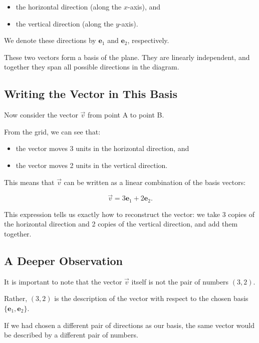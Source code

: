 \documentclass[11pt,openany]{book}
\theoremstyle{definition}
\begin{document}
\begin{itemize}
  \item the horizontal direction (along the $x$-axis), and
  \item the vertical direction (along the $y$-axis).
\end{itemize}

We denote these directions by $\mathbf{e}_1$ and $\mathbf{e}_2$, respectively.

These two vectors form a basis of the plane. 
They are linearly independent, and together they span all possible directions in the diagram.

\medskip

\subsection{Writing the Vector in This Basis}

Now consider the vector $\vec{v}$ from point A to point B.

From the grid, we can see that:

\begin{itemize}
  \item the vector moves 3 units in the horizontal direction, and
  \item the vector moves 2 units in the vertical direction.
\end{itemize}

This means that $\vec{v}$ can be written as a linear combination of the basis vectors:

\[
\vec{v} = 3\mathbf{e}_1 + 2\mathbf{e}_2.
\]

This expression tells us exactly how to reconstruct the vector:
we take 3 copies of the horizontal direction and 2 copies of the vertical direction, and add them together.

\medskip

\subsection{A Deeper Observation}

It is important to note that the vector $\vec{v}$ itself is not the pair of numbers $(3,2)$.

Rather, $(3,2)$ is the description of the vector with respect to the chosen basis $\{\mathbf{e}_1, \mathbf{e}_2\}$.

If we had chosen a different pair of directions as our basis, the same vector would be described by a different pair of numbers.
\end{document}
